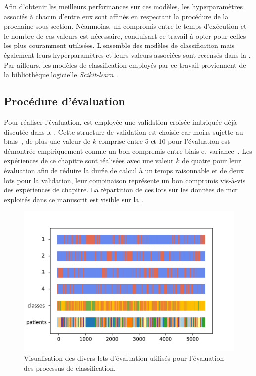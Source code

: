 Afin d'obtenir les meilleurs performances sur ces modèles, les hyperparamètres associés à chacun d'entre eux sont affinés en respectant la procédure de la prochaine sous-section. Néanmoins, un compromis entre le temps d'exécution et le nombre de ces valeurs est nécessaire, conduisant ce travail à opter pour celles les plus couramment utilisées. L'ensemble des modèles de classification mais également leurs hyperparamètres et leurs valeurs associées sont recensés dans la . Par ailleurs, les modèles de classification employés par ce travail proviennent de la bibliothèque logicielle \textit{Scikit-learn}~\cite{pedregosa2011}.\par

\subsection{Procédure d'évaluation}
Pour réaliser l'évaluation, est employée une validation croisée imbriquée déjà discutée dans le . Cette structure de validation est choisie car moins sujette au biais~\cite{Cawley2010}, de plus une valeur de $k$ comprise entre 5 et 10 pour l'évaluation est démontrée empiriquement comme un bon compromis entre biais et variance~\cite{James2000}. Les expériences de ce chapitre sont réalisées avec une valeur $k$ de quatre pour leur évaluation afin de réduire la durée de calcul à un temps raisonnable et de deux lots pour la validation, leur combinaison représente un bon compromis vis-à-vis des expériences de chapitre. La répartition de ces lots sur les données de \gls{mcr} exploités dans ce manuscrit est visible sur la .\par

\begin{figure}[H]
    \centering
    \includegraphics[width=0.8\linewidth]{contents/chapter_5/resources/visualisation_folds.png}
    \caption{Visualisation des divers lots d'évaluation utilisés pour l'évaluation des processus de classification.}
    \label{fig:visualisation_folds}
\end{figure}\par

